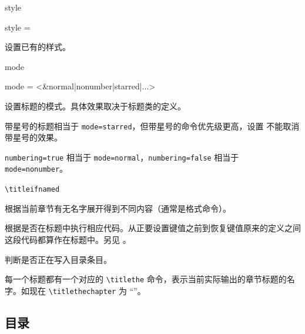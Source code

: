 \documentclass{cusdoc}
\begin{document}
\begin{keyval}[path=title/...]{style}
  \begin{syntax}
    style = 
  \end{syntax}
设置已有的样式。
\end{keyval}

\begin{keyval}[path=title/...]{mode}
  \begin{syntax}
    mode = <&normal|nonumber|starred|...>
  \end{syntax}
设置标题的模式。具体效果取决于标题类的定义。

带星号的标题相当于 \verb|mode=starred|，但带星号的命令优先级更高，设置 
不能取消带星号的效果。

\verb|numbering=true| 相当于 \verb|mode=normal|，\verb|numbering=false| 相当于 
\verb|mode=nonumber|。
\end{keyval}

\begin{function}[EXP]{\titleifnamed}
  \begin{syntax}
    \verb|\titleifnamed|  
  \end{syntax}
根据当前章节有无名字展开得到不同内容（通常是格式命令）。
\end{function}

\begin{function}[EXP]{\ifintitle}
  \begin{syntax}
    \V\ifintitle {} 
  \end{syntax}
根据是否在标题中执行相应代码。从正要设置键值之前到恢复键值原来的定义之间这段代码都算作在标题中。另见 。
\end{function}

\begin{function}[EXP]{\ifincblentry}
  \begin{syntax}
    \V\ifincblentry {} 
  \end{syntax}
判断是否正在写入目录条目。
\end{function}

每一个标题都有一个对应的 \texttt{\textbackslash titlethe} 命令，表示当前实际输出的章节标题的名字。如现在 \verb|\titlethechapter| 为 “\titlethechapter”。


\subsection{目录}\label{sec:struct-cbl-short}
\end{document}
